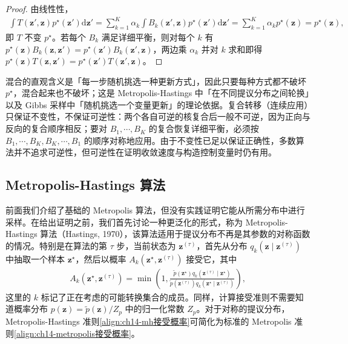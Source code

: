 \documentclass[../../main.tex]{subfiles}
\begin{document}
\begin{proof}
由线性性，
\begin{align*}
\int T\!\left(\bm{z}',\bm{z}\right)p^{\star}\!\left(\bm{z}'\right)\mathrm{d}\bm{z}'=\sum_{k=1}^{K}\alpha_{k}\int B_{k}\!\left(\bm{z}',\bm{z}\right)p^{\star}\!\left(\bm{z}'\right)\mathrm{d}\bm{z}'=\sum_{k=1}^{K}\alpha_{k}p^{\star}(\bm{z})=p^{\star}(\bm{z}),
\end{align*}
即 $T$ 不变 $p^{\star}$。若每个 $B_{k}$ 满足详细平衡，则对每个 $k$ 有 $p^{\star}(\bm{z})B_{k}\!\left(\bm{z},\bm{z}'\right)=p^{\star}\!\left(\bm{z}'\right)B_{k}\!\left(\bm{z}',\bm{z}\right)$，两边乘 $\alpha_{k}$ 并对 $k$ 求和即得 $p^{\star}(\bm{z})T\!\left(\bm{z},\bm{z}'\right)=p^{\star}\!\left(\bm{z}'\right)T\!\left(\bm{z}',\bm{z}\right)$。
\end{proof}

\begin{remark}混合的直观含义是「每一步随机挑选一种更新方式」，因此只要每种方式都不破坏 $p^{\star}$，混合起来也不破坏；这是 Metropolis-Hastings 中「在不同提议分布之间轮换」以及 Gibbs 采样中「随机挑选一个变量更新」的理论依据。复合转移（连续应用）只保证不变性，不保证可逆性：两个各自可逆的核复合后一般不可逆，因为正向与反向的复合顺序相反；要对 $B_{1},\cdots,B_{K}$ 的复合恢复详细平衡，必须按 $B_{1},\cdots,B_{K},B_{K},\cdots,B_{1}$ 的顺序对称地应用。由于不变性已足以保证正确性，多数算法并不追求可逆性，但可逆性在证明收敛速度与构造控制变量时仍有用。
\end{remark}

\subsection{Metropolis-Hastings 算法}\label{subsection:ch14-Metropolis-Hastings}

前面我们介绍了基础的 Metropolis 算法，但没有实践证明它能从所需分布中进行采样。在给出证明之前，我们首先讨论一种更泛化的形式，称为 Metropolis-Hastings 算法（Hastings, 1970），该算法适用于提议分布不再是其参数的对称函数的情况。特别是在算法的第 $\tau$ 步，当前状态为 $\bm{z}^{(\tau)}$，首先从分布 $q_{k}\!\left(\bm{z}\mid\bm{z}^{(\tau)}\right)$ 中抽取一个样本 $\bm{z}^{\star}$，然后以概率 $A_{k}\!\left(\bm{z}^{\star},\bm{z}^{(\tau)}\right)$ 接受它，其中
\begin{align}
A_{k}\!\left(\bm{z}^{\star},\bm{z}^{(\tau)}\right)=\min\left(1,\frac{\widetilde{p}\!\left(\bm{z}^{\star}\right)q_{k}\!\left(\bm{z}^{(\tau)}\mid\bm{z}^{\star}\right)}{\widetilde{p}\!\left(\bm{z}^{(\tau)}\right)q_{k}\!\left(\bm{z}^{\star}\mid\bm{z}^{(\tau)}\right)}\right),
\label{align:ch14-mh接受概率}
\end{align}
这里的 $k$ 标记了正在考虑的可能转换集合的成员。同样，计算接受准则不需要知道概率分布 $p(\bm{z})=\widetilde{p}(\bm{z})/Z_{p}$ 中的归一化常数 $Z_{p}$。对于对称的提议分布，Metropolis-Hastings 准则\eqref{align:ch14-mh接受概率}可简化为标准的 Metropolis 准则\eqref{align:ch14-metropolis接受概率}。
\end{document}
